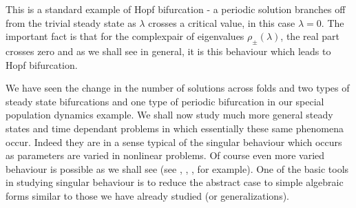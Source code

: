 This is a standard example of Hopf bifurcation - a periodic solution
branches off from the trivial steady state as $\lambda$ crosses a
critical value, in this case $\lambda = 0$. The important fact is that
for the complex\pageoriginale pair of eigenvalues $\rho_{\pm}
(\lambda)$, the real 
part crosses zero and as we shall see in general, it is this behaviour
which leads to Hopf bifurcation.  

We have seen the change in the number of solutions across folds and
two types of steady state bifurcations and one type of periodic
bifurcation in our special population dynamics example. We shall now
study much more general steady states and time dependant problems in
which essentially these same phenomena occur. Indeed they are in a
sense typical of the singular behaviour which occurs as parameters are
varied in nonlinear problems. Of course even more varied behaviour is
possible as we shall see (see \cite{key4}, \cite{key13}, \cite{key23},
for example). One 
of the basic tools in studying singular behaviour is to reduce the
abstract case to simple algebraic forms similar to those we have
already studied (or generalizations).    
